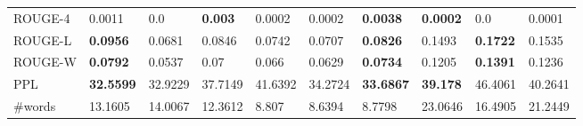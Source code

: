 \begin{table}[H]
\begin{tabular}{@{}llllllllll@{}}
        ROUGE{-}4&0.0011&0.0&\textbf{0.003}&0.0002&0.0002&\textbf{0.0038}&\textbf{0.0002}&0.0&0.0001\\%
        ROUGE{-}L&\textbf{0.0956}&0.0681&0.0846&0.0742&0.0707&\textbf{0.0826}&0.1493&\textbf{0.1722}&0.1535\\%
        ROUGE{-}W&\textbf{0.0792}&0.0537&0.07&0.066&0.0629&\textbf{0.0734}&0.1205&\textbf{0.1391}&0.1236\\%
        PPL&\textbf{32.5599}&32.9229&37.7149&41.6392&34.2724&\textbf{33.6867}&\textbf{39.178}&46.4061&40.2641\\%
        \#words&13.1605&14.0067&12.3612&8.807&8.6394&8.7798&23.0646&16.4905&21.2449\\\bottomrule
    \end{tabular}
\end{table}